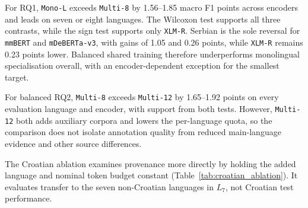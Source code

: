\documentclass{article}
\begin{document}

For RQ1, \texttt{Mono-L} exceeds \texttt{Multi-8} by 1.56--1.85 macro F1 points across encoders and leads on seven or eight languages.
The Wilcoxon test supports all three contrasts, while the sign test supports only \texttt{XLM-R}.
Serbian is the sole reversal for \texttt{mmBERT} and \texttt{mDeBERTa-v3}, with gains of 1.05 and 0.26 points, while \texttt{XLM-R} remains 0.23 points lower.
Balanced shared training therefore underperforms monolingual specialisation overall, with an encoder-dependent exception for the smallest target.

For balanced RQ2, \texttt{Multi-8} exceeds \texttt{Multi-12} by 1.65--1.92 points on every evaluation language and encoder, with support from both tests.
However, \texttt{Multi-12} both adds auxiliary corpora and lowers the per-language quota, so the comparison does not isolate annotation quality from reduced main-language evidence and other source differences.

The Croatian ablation examines provenance more directly by holding the added language and nominal token budget constant (Table~\ref{tab:croatian_ablation}).
It evaluates transfer to the seven non-Croatian languages in $L_7$, not Croatian test performance.
\end{document}

